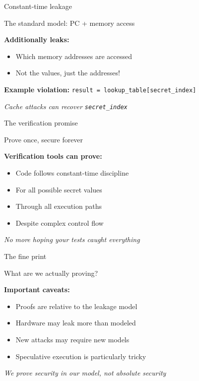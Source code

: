 \documentclass[aspectratio=169, lualatex, handout]{beamer}
\begin{document}
\begin{frame}{Constant-time leakage}
	\begin{center}
		\Large
		The standard model: PC + memory access
	\end{center}
	\vspace{1em}
	\textbf{Additionally leaks:}
	\begin{itemize}
		\item Which memory addresses are accessed
		\item Not the values, just the addresses!
	\end{itemize}
	\vspace{0.5em}
	\textbf{Example violation:} \texttt{result = lookup\_table[secret\_index]}
	\vspace{0.5em}
	\begin{center}
		\textit{Cache attacks can recover \texttt{secret\_index}}
	\end{center}
\end{frame}

\begin{frame}{The verification promise}
	\begin{center}
		\Large
		Prove once, secure forever
	\end{center}
	\vspace{1em}
	\textbf{Verification tools can prove:}
	\begin{itemize}
		\item Code follows constant-time discipline
		\item For all possible secret values
		\item Through all execution paths
		\item Despite complex control flow
	\end{itemize}
	\vspace{0.5em}
	\begin{center}
		\textit{No more hoping your tests caught everything}
	\end{center}
\end{frame}

\begin{frame}{The fine print}
	\begin{center}
		\Large
		What are we actually proving?
	\end{center}
	\vspace{1em}
	\textbf{Important caveats:}
	\begin{itemize}
		\item Proofs are relative to the leakage model
		\item Hardware may leak more than modeled
		\item New attacks may require new models
		\item Speculative execution is particularly tricky
	\end{itemize}
	\vspace{0.5em}
	\begin{center}
		\textit{We prove security in our model, not absolute security}
	\end{center}
\end{frame}
\end{document}
